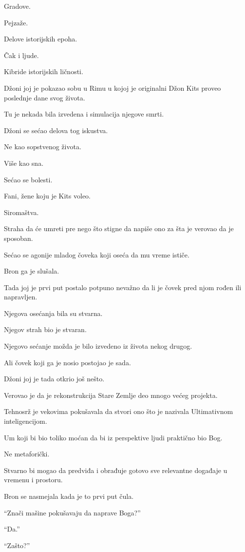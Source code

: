 Gradove.

Pejzaže.

Delove istorijskih epoha.

Čak i ljude.

Kibride istorijskih ličnosti.

Džoni joj je pokazao sobu u Rimu u kojoj je originalni Džon Kits proveo poslednje dane svog života.

Tu je nekada bila izvedena i simulacija njegove smrti.

Džoni se sećao delova tog iskustva.

Ne kao sopstvenog života.

Više kao sna.

Sećao se bolesti.

Fani, žene koju je Kits voleo.

Siromaštva.

Straha da će umreti pre nego što stigne da napiše ono za šta je verovao da je sposoban.

Sećao se agonije mladog čoveka koji oseća da mu vreme ističe.

Bron ga je slušala.

Tada joj je prvi put postalo potpuno nevažno da li je čovek pred njom rođen ili napravljen.

Njegova osećanja bila su stvarna.

Njegov strah bio je stvaran.

Njegovo sećanje možda je bilo izvedeno iz života nekog drugog.

Ali čovek koji ga je nosio postojao je sada.

\bigskip

Džoni joj je tada otkrio još nešto.

Verovao je da je rekonstrukcija Stare Zemlje deo mnogo većeg projekta.

Tehnosrž je vekovima pokušavala da stvori ono što je nazivala Ultimativnom inteligencijom.

Um koji bi bio toliko moćan da bi iz perspektive ljudi praktično bio Bog.

Ne metaforički.

Stvarno bi mogao da predviđa i obrađuje gotovo sve relevantne događaje u vremenu i prostoru.

Bron se nasmejala kada je to prvi put čula.

``Znači mašine pokušavaju da naprave Boga?''

``Da.''

``Zašto?''

